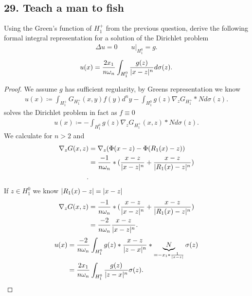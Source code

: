 \subsection*{29. Teach a man to fish}
\begin{exercise}[a]
 Using the Green's function of $H_1^{+} $  from the previous question, derive the following formal 
 integral representation for a solution of the Dirichlet problem 
 \begin{align*}
   \Delta u  = 0 \qquad u \rvert_{H_1^{0} }   = g
 .\end{align*}
 \begin{align*}
   u(x) = \frac{2x_{1}}{n \omega_n} \int_{H_{1}^{0} } \frac{g(z)}{\lvert x-z\rvert^{n} } d \sigma(z)
 .\end{align*}
\end{exercise}
\begin{proof}
 We assume $g$ has sufficient regularity, by Greens representation we know
 \begin{align*}
   u(x) \coloneqq  \int_{H_1^{+}} G_{H_1^{+} }(x,y) f(y) d^{n}y  - \int_{H_1^{0} } g(z) \nabla_z G_{H_1^{+} } * N d \sigma(z)
 .\end{align*}
 solves the Dirichlet problem in fact  as $f \equiv 0$
\begin{align*}
  u(x) \coloneqq  - \int_{H_1^{0} } g(z) \nabla_z G_{H_1^{+} }(x,z) * N d \sigma(z)
.\end{align*}
We calculate for $n>2$ and 
\begin{align*}
 \nabla_z  G(x,z) &= \nabla_z ( \Phi(x-z) - \Phi(R_{1}(x)-z))\\
                                         &= \frac{-1}{n \omega_n}*(\frac{x-z}{\lvert x-z\rvert^{n} } + \frac{x-z}{\lvert R_1(x)-z\rvert^{n} })\\
.\end{align*}
If  $z \in  H_1^{0} $ we know $\lvert R_1(x) - z\rvert = \lvert x-z\rvert$
\begin{align*}
    \nabla_z G(x,z) &= \frac{-1}{n \omega_n}*(\frac{x-z}{\lvert x-z\rvert^{n} } + \frac{x-z}{\lvert R_1(x)-z\rvert^{n} })\\
                                         &= \frac{-2}{n \omega_n}\frac{x-z}{\lvert x-z\rvert^{n} }
.\end{align*}
\begin{align*}
  u(x) &=  \frac{-2}{n \omega_n} \int_{H_1^{0} } g(z) * \frac{x-z}{\lvert z-x\rvert^{n} }*\underbrace{N}_{=-x_{1}*\frac{1}{\lvert x-z\rvert}} \sigma(z) \\
       &=  \frac{2x_{1}}{n \omega_n} \int_{H_1^{0} }  \frac{g(z)}{\lvert z-x\rvert^{n} } \sigma(z)
.\end{align*}
\end{proof}

